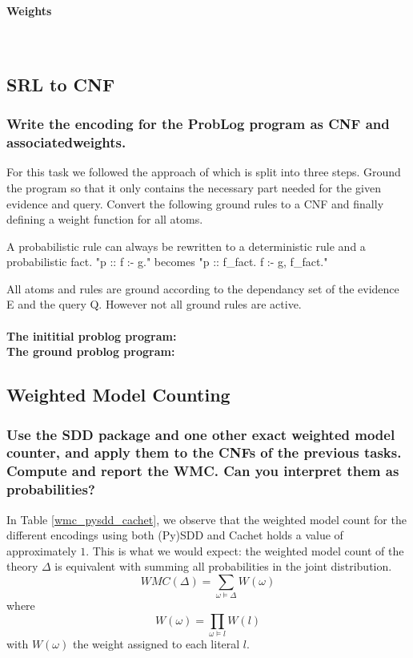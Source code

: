 \documentclass{article}
\begin{document}
\paragraph{Weights}\mbox{}\\



\subsection{SRL to CNF}
\subsubsection{Write the encoding for the ProbLog program as CNF and associatedweights.}
For this task we followed the approach of \cite{Fierens} which is split into three steps. Ground the program so that it only contains the necessary part needed for the given evidence and query. Convert the following ground rules to a CNF and finally defining a weight function for all atoms.

A probabilistic rule can always be rewritten to a deterministic rule and a probabilistic fact. "p :: f :- g." becomes "p :: f\_fact. f :- g, f\_fact."

All atoms and rules are ground according to the dependancy set of the evidence E and the query Q. However not all ground rules are active.
\\\\
\textbf{The inititial problog program:}
\\

\textbf{The ground problog program:}
\\

\subsection{Weighted Model Counting}

\subsubsection{Use the SDD package and one other exact weighted model counter, and apply them to the CNFs of the previous tasks. Compute and report the WMC. Can you interpret them as probabilities?}
In Table \ref{wmc_pysdd_cachet}, we observe that the weighted model count for the different encodings using both (Py)SDD and Cachet holds a value of approximately $1$. This is what we would expect: the weighted model count of the theory $\Delta$ is equivalent with summing all probabilities in the joint distribution.
$$WMC(\Delta) = \sum_{\omega \models \Delta} W(\omega)$$
where
$$W(\omega) = \prod_{\omega \models l}W(l)$$
with $W(\omega)$ the weight assigned to each literal $l$.\cite{chavira}
\end{document}
